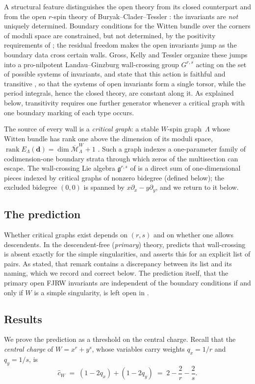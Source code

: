 \documentclass[11pt]{amsart}
\theoremstyle{definition}
\theoremstyle{remark}
\newcommand{\rank}{\operatorname{rank}}
\newcommand{\Mbar}{\overline{\mathcal{M}}}
\newcommand{\gfrak}{\mathfrak{g}}
\newcommand{\chat}{\hat{c}}
\begin{document}
A structural feature distinguishes the open theory from its closed counterpart
and from the open $r$-spin theory of Buryak--Clader--Tessler
\cite{BCT21,BCT18}: the invariants are \emph{not} uniquely determined. Boundary conditions
for the Witten bundle over the corners of moduli space are constrained, but not
determined, by the positivity requirements of \cite{GKT}; the residual freedom
makes the open invariants jump as the boundary data cross certain walls. Gross,
Kelly and Tessler organize these jumps into a pro-nilpotent Landau--Ginzburg
wall-crossing group $G^{r,s}$ acting on the set of possible systems of
invariants, and state that this action is faithful and transitive
\cite[Theorems~0.7 and~4.27]{GKT}, so that the systems of open invariants form
a single torsor, while the period integrals, hence the closed theory, are
constant along it.  As explained below, transitivity requires one further
generator whenever a critical graph with one boundary marking of each type
occurs.

The source of every wall is a \emph{critical graph}: a stable $W$-spin
graph~$\Lambda$ whose Witten bundle has rank one above the dimension of its
moduli space, $\rank E_{\Lambda}(\mathbf d)=\dim\Mbar^{W}_{\Lambda}+1$
\cite[Definition~2.33]{GKT}. Such a graph indexes a one-parameter family of
codimension-one boundary strata through which zeros of the multisection can
escape. The wall-crossing Lie algebra $\gfrak^{r,s}$ of
\cite[Definition~4.23]{GKT} is a direct sum of one-dimensional pieces indexed
by critical graphs of nonzero bidegree (defined below); the excluded bidegree $(0,0)$ is
spanned by $x\partial_x-y\partial_y$, and we return to it below.

\subsection*{The prediction}
Whether critical graphs exist depends on $(r,s)$ and on whether one allows
descendents. In the descendent-free (\emph{primary}) theory,
\cite[Remark~0.9]{GKT} predicts that wall-crossing is absent exactly for the
simple singularities, and asserts this for an explicit list of pairs. As stated,
that remark contains a discrepancy between its list and its naming, which we
record and correct below. The prediction itself, that the primary open FJRW
invariants are independent of the boundary conditions if and only if $W$ is a
simple singularity, is left
open in \cite[Remark~0.9]{GKT}.

\subsection*{Results}
We prove the prediction as a threshold on the central charge.  Recall that the
\emph{central charge} of $W=x^{r}+y^{s}$, whose variables carry weights
$q_{x}=1/r$ and $q_{y}=1/s$, is
\begin{equation}
\label{eq:centralcharge}
\chat_{W}\;=\;(1-2q_{x})+(1-2q_{y})\;=\;2-\frac{2}{r}-\frac{2}{s}.
\end{equation}
\end{document}
